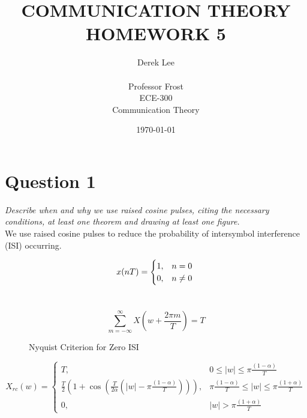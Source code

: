 \documentclass[12pt]{report}
\title{ \normalsize \LARGE {\uppercase{Communication Theory Homework 5}}}
\author{
    Derek Lee \\\\ 
    Professor Frost \\ ECE-300 \\ Communication Theory
}
\date{\today}
\newcommand{\abs}[1]{\lvert #1 \rvert}              %
\newcommand{\viff}{\Big\Updownarrow}                %
\begin{document}
\maketitle
\newpage

\section*{Question 1}
\textit{Describe when and why we use raised cosine pulses, citing the necessary conditions, at least
one theorem and drawing at least one figure.} \\

We use raised cosine pulses to reduce the probability of intersymbol interference (ISI) occurring. \\

\begin{figure}[H]
    \begin{equation}
        x(nT) =
        \begin{cases}
            1, & n = 0 \\
            0, & n \neq 0 
        \end{cases} \\
    \end{equation} \\
    
    \centering \viff
    
    \begin{equation}
        \sum_{m=-\infty}^{\infty} X(w+\frac{2\pi m}{T}) = T
    \end{equation}
    \caption{Nyquist Criterion for Zero ISI}
\end{figure}
    
    
\begin{equation}
    X_{rc}(w) =
    \begin{cases} 
        T, & 0 \leq \abs{w} \leq \pi \frac{(1-\alpha)}{T} \\
        \frac{T}{2}(1+\cos(\frac{T}{2\alpha}( \abs{w} - \pi \frac{(1-\alpha)}{T} ))), & \pi \frac{(1-\alpha)}{T} \leq \abs{w} \leq \pi \frac{(1+\alpha)}{T} \\
        0, & \abs{w} > \pi \frac{(1+\alpha)}{T}
    \end{cases}
\end{equation} 
\end{document}
